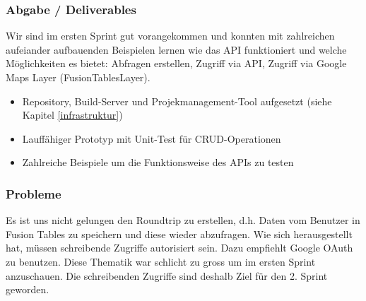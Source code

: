 \subsubsection{Abgabe / Deliverables}
Wir sind im ersten Sprint gut vorangekommen und konnten mit zahlreichen aufeiander aufbauenden Beispielen lernen wie das \gls{API} funktioniert und welche Möglichkeiten es bietet: Abfragen erstellen, Zugriff via \gls{API}, Zugriff via Google Maps Layer (FusionTablesLayer).

\begin{itemize}
	\item Repository, Build-Server und Projekmanagement-Tool aufgesetzt (siehe Kapitel \ref{infrastruktur})
	\item Lauffähiger Prototyp mit Unit-Test für CRUD-Operationen
	\item Zahlreiche Beispiele um die Funktionsweise des \gls{API}s zu testen
\end{itemize}

\subsubsection{Probleme}
Es ist uns nicht gelungen den Roundtrip zu erstellen, d.h. Daten vom Benutzer in Fusion Tables zu speichern und diese wieder abzufragen. Wie sich herausgestellt hat, müssen schreibende Zugriffe autorisiert sein. Dazu empfiehlt Google \gls{OAuth} zu benutzen. Diese Thematik war schlicht zu gross um im ersten Sprint anzuschauen. Die schreibenden Zugriffe sind deshalb Ziel für den 2. Sprint geworden. 
